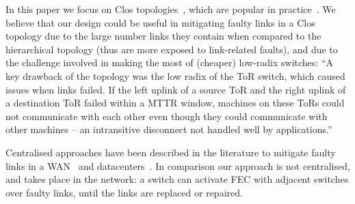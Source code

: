 In this paper we focus on Clos
topologies~\cite{clos_bstj1953,Al-Fares:2008:SCD:1402946.1402967}, 
which are popular in
practice~\cite{Singh:2016:JRD:2991470.2975159}.
We believe that our design could be useful in mitigating faulty links in a Clos
topology due to the large number links they contain when compared to the
hierarchical topology (thus are more exposed to link-related faults), and due
to the challenge involved in making the most of (cheaper) low-radix switches:
``A key drawback of the topology was the low radix of
the ToR switch, which caused issues when links failed.
If the left uplink of a source ToR and the right uplink
of  a  destination  ToR  failed  within  a  MTTR  window,
machines  on  these  ToRs  could  not  communicate  with
each other even though they could communicate with
other machines -- an intransitive disconnect not handled
well by applications.''~\cite[\S3.1]{Singh:2016:JRD:2991470.2975159}

Centralised approaches have been described in the literature to mitigate
faulty links in a WAN~\cite{traffic-engineering-with-forward-fault-correction}
and datacenters~\cite{Zhuo:2017:UMP:3098822.3098849}. In comparison our approach
is not centralised, and takes place in the network: a switch can activate
FEC with adjacent switches over faulty links, until the links are replaced or
repaired.

